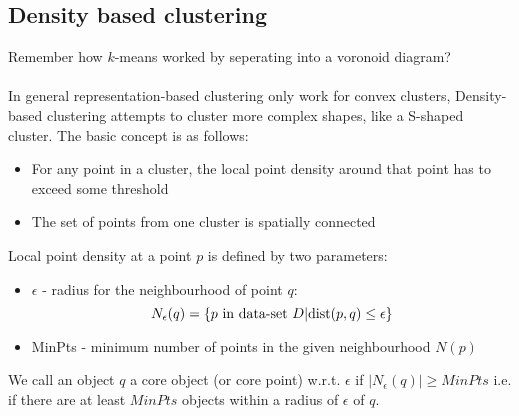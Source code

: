     \subsection{Density based clustering}
    Remember how $k$-means worked by seperating into a voronoid diagram?\\
    \\
    In general representation-based clustering only work for convex clusters, 
    Density-based clustering attempts to cluster more complex shapes, like a 
    S-shaped cluster. The basic concept is as follows:
    
    \begin{itemize}
        \item For any point in a cluster, the local point density around that 
        point has to exceed some threshold
        \item The set of points from one cluster is spatially connected
    \end{itemize}
    Local point density at a point $p$ is defined by two parameters:
    \begin{itemize}
        \item $\epsilon$ - radius for the neighbourhood of point $q$:
        \begin{equation*}
            N_\epsilon(q) = \{p \text{ in data-set } D| \text{dist}(p,q)\leq\epsilon\}
        \end{equation*}
        \item MinPts - minimum number of points in the given neighbourhood 
        $N(p)$
    \end{itemize}
    We call an object $q$ a core object (or core point) w.r.t. $\epsilon$ if 
    $|N_\epsilon(q)| \geq MinPts$ i.e. if there are at least $MinPts$ objects 
    within a radius of $\epsilon$ of $q$.
    
